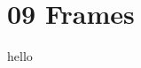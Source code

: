 \documentclass[9pt,xcolor={svgnames, x11names}]{beamer}
\begin{document}
\section{09 Frames}
\begin{frame}
	hello
\end{frame}

\end{document}
